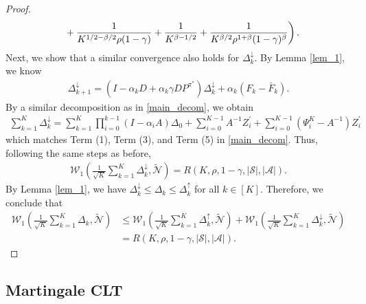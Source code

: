 \documentclass{opt2025} %
\begin{document}
\begin{proof}
\begin{align*}
&\left. \indent + \frac{1}{K^{1/2-\beta/2}\rho(1-\gamma)} + \frac{1}{K^{\beta-1/2}} + \frac{1}{K^{\beta/2}\rho^{1+\beta}(1-\gamma)^{\beta}} \right).
\end{align*}
Next, we show that a similar convergence also holds for $\Delta^{\downarrow}_{k}$. By Lemma \ref{lem_1}, we know
\begin{align*}
\Delta^{\downarrow}_{k+1} = (I - \alpha_kD + \alpha_k \gamma D P^{\pi^*})\Delta^{\downarrow}_k  + \alpha_k(F_k - \bar{F}_k).
\end{align*}
By a similar decomposition as in \cref{main_decom}, we obtain
\begin{align*}
\sum_{k=1}^K\Delta^{\downarrow}_{k} = \sum_{k=1}^K \prod_{i=0}^{k-1}(I - \alpha_i A)\Delta_0 + \sum_{i=0}^{K-1} A^{-1} Z_i^{\prime} + \sum_{i=0}^{K-1} (\Psi_i^K- A^{-1}) Z_i^{\prime}
\end{align*}
which matches Term (1), Term (3), and Term (5) in \cref{main_decom}. Thus, following the same steps as before,
\begin{align*}
\mathcal{W}_1 \left( \frac{1}{\sqrt{K}} \sum_{k=1}^K\Delta^{\downarrow}_{k}, \tilde{\mathcal{N}}  \right) = R(K,\rho,1-\gamma,|\mathcal{S}|,|\mathcal{A}|).
\end{align*}
By Lemma \ref{lem_1}, we have $\Delta^{\downarrow}_k \leq \Delta_k \leq \Delta^{\uparrow}_k$ for all $k \in [K]$. Therefore, we conclude that
\begin{align*}
\mathcal{W}_1 \left( \frac{1}{\sqrt{K}} \sum_{k=1}^K\Delta_{k}, \tilde{\mathcal{N}}  \right) &\leq \mathcal{W}_1 \left( \frac{1}{\sqrt{K}} \sum_{k=1}^K\Delta^{\uparrow}_{k}, \tilde{\mathcal{N}}  \right) + \mathcal{W}_1 \left( \frac{1}{\sqrt{K}} \sum_{k=1}^K\Delta^{\downarrow}_{k}, \tilde{\mathcal{N}}  \right) \\
&= R(K,\rho,1-\gamma,|\mathcal{S}|,|\mathcal{A}|).
\end{align*}
\end{proof}



\subsection{Martingale CLT}
\end{document}
